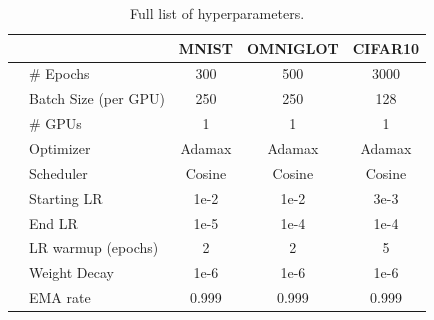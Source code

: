 \begin{table}[h]
\caption{Full list of hyperparameters.}
\label{tab:5_dvp_setup}
\begin{center}
\begin{tabular}{ll||cc|cc|cc}
\toprule
& &  \multicolumn{2}{c|}{MNIST}   & \multicolumn{2}{c|}{OMNIGLOT} 
& \multicolumn{2}{c}{CIFAR10} \\
\midrule
\small{\multirow{11}{*}{\STAB{\rotatebox[origin=c]{90}{Optimization}}}} 
& \# Epochs              & \multicolumn{2}{c|}{300}     
                         & \multicolumn{2}{c|}{500}
                         & \multicolumn{2}{c}{3000}
\\
& Batch Size (per GPU)   & \multicolumn{2}{c|}{250}     & \multicolumn{2}{c|}{250}
                         & \multicolumn{2}{c}{128}
\\
& \# GPUs                & \multicolumn{2}{c|}{1}       & \multicolumn{2}{c|}{1}
                         & \multicolumn{2}{c}{1}
\\
& Optimizer              & \multicolumn{2}{c|}{Adamax}  
                         & \multicolumn{2}{c|}{Adamax}  
                         & \multicolumn{2}{c}{Adamax} 
\\
& Scheduler              &  \multicolumn{2}{c|}{Cosine} 
                         & \multicolumn{2}{c|}{Cosine} 
                         & \multicolumn{2}{c}{Cosine}
\\
& Starting LR            &  \multicolumn{2}{c|}{1e-2}   
                         & \multicolumn{2}{c|}{1e-2} 
                         & \multicolumn{2}{c}{3e-3} 
\\ 
& End LR                 &  \multicolumn{2}{c|}{1e-5}   
                         & \multicolumn{2}{c|}{1e-4} 
                         & \multicolumn{2}{c}{1e-4}
\\ 
& LR warmup (epochs)     &  \multicolumn{2}{c|}{2}   
                         & \multicolumn{2}{c|}{2} 
                         & \multicolumn{2}{c}{5}
\\ 
& Weight Decay           &  \multicolumn{2}{c|}{1e-6}   
                         & \multicolumn{2}{c|}{1e-6} 
                         & \multicolumn{2}{c}{1e-6}
\\
& EMA rate               & \multicolumn{2}{c|}{0.999}       & \multicolumn{2}{c|}{0.999}
                         & \multicolumn{2}{c}{0.999}
\\

\end{tabular}
\end{center}
\end{table}
